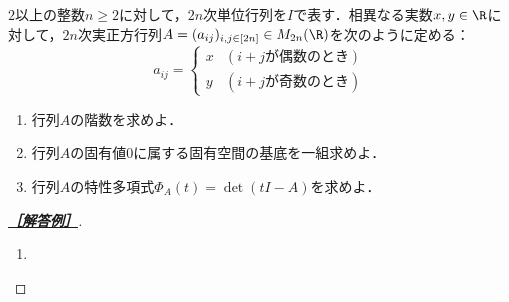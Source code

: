 \documentclass[uplatex,dvipdfmx]{jsarticle}
\begin{document}
\begin{tcolorbox}[colframe=ForestGreen, colback=ForestGreen!10!white,breakable,colbacktitle=ForestGreen!40!white,coltitle=black,fonttitle=\bfseries\sffamily,
    title=A 第1問（必答）]
    $2$以上の整数$n\ge2$に対して，$2n$次単位行列を$I$で表す．相異なる実数$x,y\in\R$に対して，$2n$次実正方行列$A=(a_{ij})_{i,j\in[2n]}\in M_{2n}(\R)$を次のように定める：
    \[a_{ij}=\begin{cases}
        x&(i+j\text{が偶数のとき})\\
        y&(i+j\text{が奇数のとき})
    \end{cases}\]
    \begin{enumerate}
        \item 行列$A$の階数を求めよ．
        \item 行列$A$の固有値$0$に属する固有空間の基底を一組求めよ．
        \item 行列$A$の特性多項式$\Phi_A(t)=\det(tI-A)$を求めよ．
    \end{enumerate}
\end{tcolorbox}
\begin{proof}[\textbf{\underline{［解答例］}}]\mbox{}
    \begin{enumerate}
        \item 
    \end{enumerate}
\end{proof}
\end{document}
